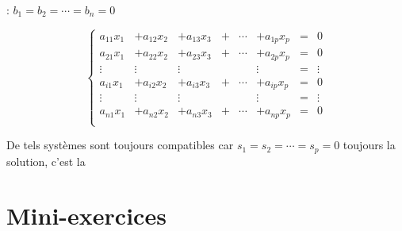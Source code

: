 \begin{frame}


 : $b_1=b_2=\cdots=b_n=0$

\pause

$$\left\{
\begin{array}{cccccccl}
 a_{11}x_1 & +a_{12}x_2  &+a_{13}x_3&+&\cdots&+a_{1p}x_p&=&0   \\
 a_{21}x_1 & +a_{22}x_2  &+a_{23}x_3&+&\cdots&+a_{2p}x_p&=&0  \\
 \vdots &  \vdots  & \vdots&&& \vdots&=& \vdots   \\
 a_{i1}x_1 & +a_{i2}x_2  &+a_{i3}x_3&+&\cdots&+a_{ip}x_p&=&0  \\
 \vdots &  \vdots  & \vdots&&& \vdots&=& \vdots   \\
 a_{n1}x_1 & +a_{n2}x_2  &+a_{n3}x_3&+&\cdots&+a_{np}x_p&=&0  \\
   \end{array}
\right.
$$

\pause

De tels systèmes sont toujours compatibles car $s_1=s_2=\cdots=s_p=0$ toujours 
la solution, c'est la 

\end{frame}




\section{Mini-exercices}

